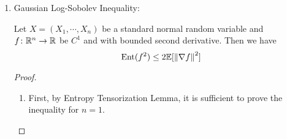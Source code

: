 \begin{enumerate}[label=\arabic{*}.]
	\begin{proof}[Proof of Binary Log-Sobolev Inequality]
	    \begin{enumerate}[label=(\Roman*)]
	    	\item Assume $n=1$: For $f \colon \bb{-1,1} \sto \R$ with $f(-1) = a$ and $f(1) = b$, we have
	    	\begin{equation*}
	    	    \op{Ent}(f^2) = \frac{1}{2}a^2\log a^2 + \frac{1}{2}b^2\log b^2 -\frac{a^2+b^2}{2}\log\frac{a^2+b^2}{2}
	    	\end{equation*}
	    	and 
	    	\begin{equation*}
	    	    \E[\op{Var}_{(1)}(f)] = \op{Var}(f) = \frac{1}{2}\bc{a-\frac{a+b}{2}}^2 + \frac{1}{2}\bc{b-\frac{a+b}{2}}^2 = \frac{(b-a)^2}{4}
	    	\end{equation*}
	    	Therefore, it is sufficient to show
	    	\begin{equation*}
	    	    h_b(a) = \frac{1}{2}a^2\log a^2 + \frac{1}{2}b^2\log b^2 -\frac{a^2+b^2}{2}\log\frac{a^2+b^2}{2} - \frac{(b-a)^2}{2},\quad \forall~a \geq b \leq 0
	    	\end{equation*}
	    	which is not difficult.
	    	\item By the Entropy Tensorization Lemma,
	    	\begin{equation*}
	    	   	\op{Ent}(f^2) \leq \sum_{i=1}^n \E\bj{\op{Ent}_{(i)}(f^2)} 
	    	\end{equation*}
	    	Then since for $n=1$, we already get
	    	\begin{equation*}
	    	    \op{Ent}_{(i)}(f^2) \leq \op{Var}_{(i)}(f)
	    	\end{equation*}
	    	Therefore,
	    	\begin{equation*}
	    	    \op{Ent}(f^2) \leq \sum_{i=1}^n\E\bj{\op{Var}_{(i)}(f)} \qedhere
	    	\end{equation*}
	    \end{enumerate}
	\end{proof}

	\item Gaussian Log-Sobolev Inequality: 
	\begin{thm}
	    Let $X=(X_1,\cdots,X_n)$ be a standard normal random variable and $f \colon \mathbb{R}^n \rightarrow \mathbb{R}$ be $C^1$ and with bounded second derivative. Then we have
	    \begin{equation*}
	        \operatorname{Ent}(f^2) \leq 2\mathbb{E}[\left\lVert\nabla f\right\lVert^2]
	    \end{equation*}
	\end{thm}
	\begin{proof}
	    \begin{enumerate}[label=\Roman*.]
	    	\item First, by Entropy Tensorization Lemma, it is sufficient to prove the inequality for $n=1$.


\end{enumerate}
\end{proof}
\end{enumerate}

